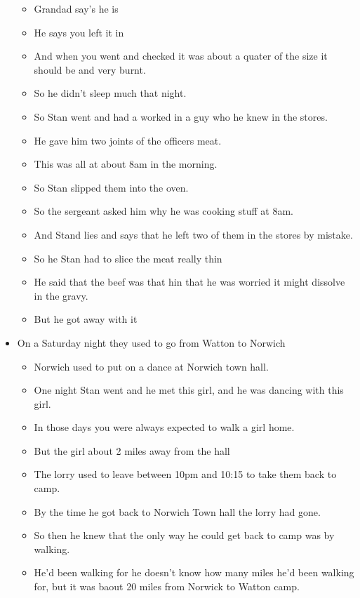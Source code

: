 \documentclass[10pt,twocolumn,letterpaper]{article}
\begin{document}
\begin{itemize}
\begin{itemize}
              \item Grandad say's he is
              \item He says you left it in
              \item And when you went and checked it was about a quater of the size it should be and very burnt.
              \item So he didn't sleep much that night.
              \item So Stan went and had a worked in a guy who he knew in the stores.
              \item He gave him two joints of the officers meat.
              \item This was all at about 8am in the morning.
              \item So Stan slipped them into the oven.
              \item So the sergeant asked him why he was cooking stuff at 8am.
              \item And Stand lies and says that he left two of them in the stores by mistake.
              \item So he Stan had to slice the meat really thin
              \item He said that the beef was that hin that he was worried it might dissolve in the gravy.
              \item But he got away with it
          \end{itemize}
    \item On a Saturday night they used to go from Watton to Norwich
          \begin{itemize}
              \item Norwich used to put on a dance at Norwich town hall.
              \item One night Stan went and he met this girl, and he was dancing with this girl.
              \item In those days you were always expected to walk a girl home.
              \item But the girl about 2 miles away from the hall
              \item The lorry used to leave between 10pm and 10:15 to take them back to camp.
              \item By the time he got back to Norwich Town hall the lorry had gone.
              \item So then he knew that the only way he could get back to camp was by walking.
              \item He'd been walking for he doesn't know how many miles he'd been walking for, but it was baout 20 miles from Norwick to Watton camp.

\end{itemize}
\end{itemize}
\end{document}
